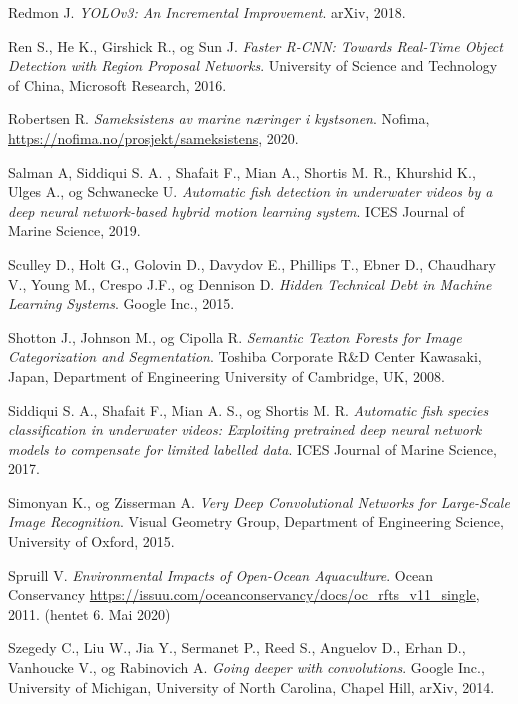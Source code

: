 \documentclass[11ot]{article}
\begin{document}
\begin{thebibliography}{9}
Redmon J. 
\textit{YOLOv3: An Incremental Improvement}. 
arXiv, 2018.

Ren S., He K., Girshick R., og Sun J.
\textit{Faster R-CNN: Towards Real-Time Object Detection with Region Proposal Networks}. 
University of Science and Technology of China, Microsoft Research, 2016.

Robertsen R. 
\textit{Sameksistens av marine næringer i kystsonen}. 
Nofima, \url{https://nofima.no/prosjekt/sameksistens}, 2020.

Salman A, Siddiqui S. A. , Shafait F., Mian A., Shortis M. R., Khurshid K., Ulges A., og Schwanecke U. 
\textit{Automatic fish detection in underwater videos by a deep neural network-based hybrid motion learning system}. 
ICES Journal of Marine Science, 2019.

Sculley D., Holt G., Golovin D., Davydov E., Phillips T., Ebner D., Chaudhary V., Young M., Crespo J.F., og Dennison D. 
\textit{Hidden Technical Debt in Machine Learning Systems}. 
Google Inc., 2015.


Shotton J., Johnson M., og Cipolla R. 
\textit{Semantic Texton Forests for Image Categorization and Segmentation}. 
Toshiba Corporate R\&D Center Kawasaki, Japan, Department of Engineering University of Cambridge, UK, 2008.

Siddiqui S. A., Shafait F., Mian A. S., og Shortis M. R. 
\textit{Automatic fish species classification in underwater videos: Exploiting pretrained deep neural network models to compensate for limited labelled data}. 
ICES Journal of Marine Science, 2017.

Simonyan K., og Zisserman A. 
\textit{Very Deep Convolutional Networks for Large-Scale Image Recognition}. 
Visual Geometry Group, Department of Engineering Science, University of Oxford, 2015.

Spruill V.
\textit{Environmental Impacts of Open-Ocean Aquaculture}. 
Ocean Conservancy \url{https://issuu.com/oceanconservancy/docs/oc_rfts_v11_single}, 2011. (hentet 6. Mai 2020)

Szegedy C., Liu W., Jia Y., Sermanet P., Reed S., Anguelov D., Erhan D., Vanhoucke V., og Rabinovich A. 
\textit{Going deeper with convolutions}. 
Google Inc., University of Michigan, University of North Carolina, Chapel Hill, arXiv, 2014.


\end{thebibliography}
\end{document}
